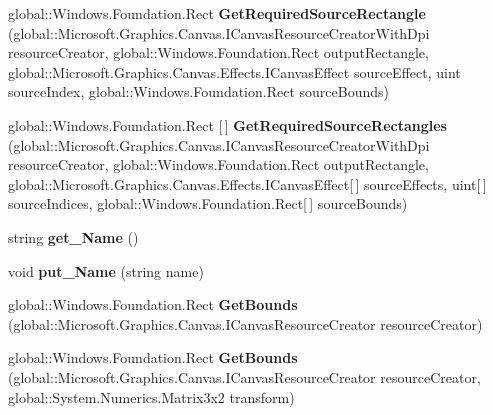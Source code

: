 \begin{DoxyCompactItemize}
global\+::\+Windows.\+Foundation.\+Rect {\bfseries Get\+Required\+Source\+Rectangle} (global\+::\+Microsoft.\+Graphics.\+Canvas.\+I\+Canvas\+Resource\+Creator\+With\+Dpi resource\+Creator, global\+::\+Windows.\+Foundation.\+Rect output\+Rectangle, global\+::\+Microsoft.\+Graphics.\+Canvas.\+Effects.\+I\+Canvas\+Effect source\+Effect, uint source\+Index, global\+::\+Windows.\+Foundation.\+Rect source\+Bounds)
\item 
\mbox{\label{class_microsoft_1_1_graphics_1_1_canvas_1_1_effects_1_1_emboss_effect_ad0e97a5a8bcc8c41e356937f7d8b5118}} 
global\+::\+Windows.\+Foundation.\+Rect \mbox{[}$\,$\mbox{]} {\bfseries Get\+Required\+Source\+Rectangles} (global\+::\+Microsoft.\+Graphics.\+Canvas.\+I\+Canvas\+Resource\+Creator\+With\+Dpi resource\+Creator, global\+::\+Windows.\+Foundation.\+Rect output\+Rectangle, global\+::\+Microsoft.\+Graphics.\+Canvas.\+Effects.\+I\+Canvas\+Effect\mbox{[}$\,$\mbox{]} source\+Effects, uint\mbox{[}$\,$\mbox{]} source\+Indices, global\+::\+Windows.\+Foundation.\+Rect\mbox{[}$\,$\mbox{]} source\+Bounds)
\item 
\mbox{\label{class_microsoft_1_1_graphics_1_1_canvas_1_1_effects_1_1_emboss_effect_ae31f9b37d1e63ccdf103dce3e2a5afaf}} 
string {\bfseries get\+\_\+\+Name} ()
\item 
\mbox{\label{class_microsoft_1_1_graphics_1_1_canvas_1_1_effects_1_1_emboss_effect_aac93b1de59ca4b3073b40ad837bf6ee8}} 
void {\bfseries put\+\_\+\+Name} (string name)
\item 
\mbox{\label{class_microsoft_1_1_graphics_1_1_canvas_1_1_effects_1_1_emboss_effect_a447c5d2e98d82eee9645d76bf8645f44}} 
global\+::\+Windows.\+Foundation.\+Rect {\bfseries Get\+Bounds} (global\+::\+Microsoft.\+Graphics.\+Canvas.\+I\+Canvas\+Resource\+Creator resource\+Creator)
\item 
\mbox{\label{class_microsoft_1_1_graphics_1_1_canvas_1_1_effects_1_1_emboss_effect_a332e3f4203f0f5fc176b241c611be3b3}} 
global\+::\+Windows.\+Foundation.\+Rect {\bfseries Get\+Bounds} (global\+::\+Microsoft.\+Graphics.\+Canvas.\+I\+Canvas\+Resource\+Creator resource\+Creator, global\+::\+System.\+Numerics.\+Matrix3x2 transform)

\end{DoxyCompactItemize}
